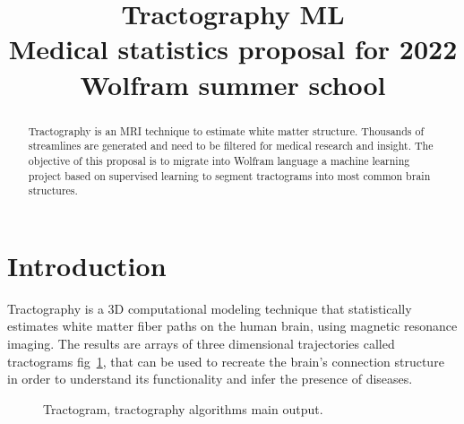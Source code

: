 \documentclass[conference]{IEEEtran}
\begin{document}
\title{
Tractography ML  \\
{\footnotesize Medical statistics proposal for 2022 Wolfram summer school}
}

\author{
}

\maketitle

\begin{abstract}
    Tractography is an MRI technique to estimate white matter structure. Thousands of streamlines are generated and need to be filtered for medical research and insight. The objective of this proposal is to migrate into Wolfram language a machine learning project based on supervised learning to segment tractograms into most common brain structures.
\end{abstract}

%
%
\section{Introduction}
Tractography is a 3D computational modeling technique that statistically estimates white matter fiber paths on the human brain, using magnetic resonance imaging. The results are arrays of three dimensional trajectories called tractograms fig~\ref{tractogram}, that can be used to recreate the brain's connection structure in order to understand its functionality and infer the presence of diseases.

\begin{figure}[htbp]
    \centerline{
    }
    \caption{Tractogram, tractography algorithms main output.}
    \label{tractogram}
\end{figure}
\end{document}
